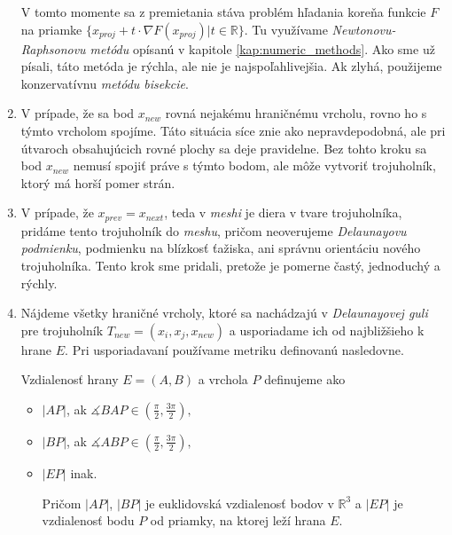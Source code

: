 \begin{enumerate}
{        V tomto momente sa z premietania 
        stáva problém hľadania koreňa funkcie $F$ na priamke 
        $\{x_{proj} + t \cdot \nabla F(x_{proj}) | t \in \mathbb{R}\}$.  
        Tu využívame
        \textit{Newtonovu-Raphsonovu metódu} opísanú v kapitole \ref{kap:numeric_methods}. Ako sme 
        už písali, táto metóda je rýchla, ale nie je najspoľahlivejšia. Ak zlyhá,
        použijeme konzervatívnu \textit{metódu bisekcie}.
    }
    \item{
        V prípade, že sa bod $x_{new}$ rovná nejakému hraničnému vrcholu, rovno ho s týmto vrcholom
        spojíme. Táto situácia síce znie ako nepravdepodobná, ale pri útvaroch obsahujúcich rovné plochy sa
        deje pravidelne. Bez tohto kroku sa bod $x_{new}$ nemusí spojiť práve s týmto bodom, ale
        môže vytvoriť trojuholník, ktorý má horší pomer strán.
    }
    \item{
        V prípade, že $x_{prev} = x_{next}$, teda v \textit{meshi} je diera v tvare trojuholníka, pridáme tento 
        trojuholník do \textit{meshu}, pričom neoverujeme \textit{Delaunayovu podmienku}, podmienku na blízkosť
        ťažiska, ani správnu orientáciu nového trojuholníka. 
        Tento krok sme pridali, pretože je pomerne častý, jednoduchý a rýchly.
    }
    \item{
        Nájdeme všetky hraničné vrcholy, ktoré sa nachádzajú v \textit{Delaunayovej guli} pre trojuholník 
        $T_{new} = (x_i, x_j, x_{new})$ a usporiadame ich od najbližšieho k hrane $E$. Pri usporiadavaní 
        používame metriku definovanú nasledovne.

        \begin{definition} Vzdialenosť hrany $E=(A,B)$ a vrchola $P$ definujeme ako
        \label{def:segment_point_distance}
        \begin{itemize}
            \item{
                $|AP|$, ak $\measuredangle BAP \in (\frac{\pi}{2}, \frac{3\pi}{2}),$
            }

            \item{
                $|BP|$, ak $\measuredangle ABP \in (\frac{\pi}{2}, \frac{3\pi}{2}),$
            }

            \item{
                $|EP|$ inak.
            }

            
            Pričom $|AP|$, $|BP|$ je euklidovská vzdialenosť bodov v $\mathbb{R}^3$ a $|EP|$ je 
            vzdialenosť bodu $P$ od priamky, na ktorej leží hrana $E$.
        \end{itemize}


\end{definition}}
\end{enumerate}
